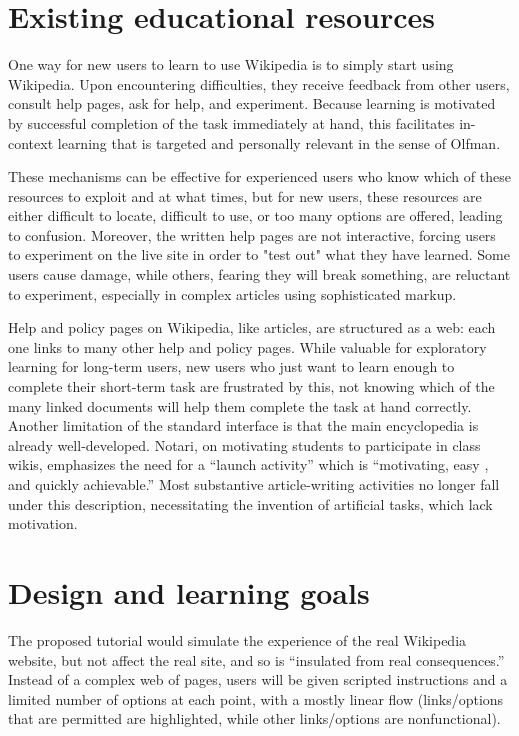 \documentclass{acm_proc_article-sp}
\begin{document}
\section{Existing educational resources}

One way for new users to learn to use Wikipedia is to simply start using Wikipedia. Upon encountering difficulties, they receive feedback from other users, consult help pages, ask for help, and experiment. Because learning is motivated by successful completion of the task immediately at hand, this facilitates in-context learning that is targeted and personally relevant in the sense of Olfman.\cite{Olfman:1991}

These mechanisms can be effective for experienced users who know which of these resources to exploit and at what times, but for new users, these resources are either difficult to locate, difficult to use, or too many options are offered, leading to confusion. Moreover, the written help pages are not interactive, forcing users to experiment on the live site in order to "test out" what they have learned. Some users cause damage, while others, fearing they will break something, are reluctant to experiment, especially in complex articles using sophisticated markup.

Help and policy pages on Wikipedia, like articles, are structured as a web: each one links to many other help and policy pages. While valuable for exploratory learning for long-term users, new users who just want to learn enough to complete their short-term task are frustrated by this, not knowing which of the many linked documents will help them complete the task at hand correctly.
Another limitation of the standard interface is that the main encyclopedia is already well-developed. Notari,\cite{Notari:2006} on motivating students to participate in class wikis, emphasizes the need for a ``launch activity'' which is ``motivating, easy , and quickly achievable.'' Most substantive article-writing activities no longer fall under this description, necessitating the invention of artificial tasks, which lack motivation.

\section{Design and learning goals}

The proposed tutorial would simulate the experience of the real Wikipedia website, but not affect the real site, and so is ``insulated from real consequences.'' \cite{Garris:2002} Instead of a complex web of pages, users will be given scripted instructions and a limited number of options at each point, with a mostly linear flow (links/options that are permitted are highlighted, while other links/options are nonfunctional).
\end{document}
